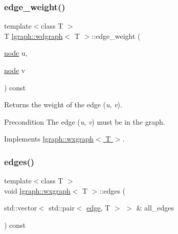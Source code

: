 \subsubsection{\texorpdfstring{edge\+\_\+weight()}{edge\_weight()}}
{\footnotesize\ttfamily template$<$class T $>$ \\
T \hyperlink{classlgraph_1_1wdgraph}{lgraph\+::wdgraph}$<$ T $>$\+::edge\+\_\+weight (\begin{DoxyParamCaption}\item[{\hyperlink{namespacelgraph_a397169dd66adf725210a30fb7251773e}{node}}]{u,  }\item[{\hyperlink{namespacelgraph_a397169dd66adf725210a30fb7251773e}{node}}]{v }\end{DoxyParamCaption}) const\hspace{0.3cm}{\ttfamily [virtual]}}



Returns the weight of the edge ({\itshape u}, {\itshape v}). 

\begin{DoxyPrecond}{Precondition}
The edge ({\itshape u}, {\itshape v}) must be in the graph. 
\end{DoxyPrecond}


Implements \hyperlink{classlgraph_1_1wxgraph_af5e23332680fdecb6db2fac3b3137982}{lgraph\+::wxgraph$<$ T $>$}.

\mbox{\label{classlgraph_1_1wxgraph_a1b89f56544185e33d54e72a8ed19a789}} 
\subsubsection{\texorpdfstring{edges()}{edges()}\hspace{0.1cm}{\footnotesize\ttfamily [1/2]}}
{\footnotesize\ttfamily template$<$class T $>$ \\
void \hyperlink{classlgraph_1_1wxgraph}{lgraph\+::wxgraph}$<$ T $>$\+::edges (\begin{DoxyParamCaption}\item[{std\+::vector$<$ std\+::pair$<$ \hyperlink{namespacelgraph_a76bd7d50719f03de7a85db259d80d572}{edge}, T $>$ $>$ \&}]{all\+\_\+edges }\end{DoxyParamCaption}) const\hspace{0.3cm}{\ttfamily [inherited]}}




